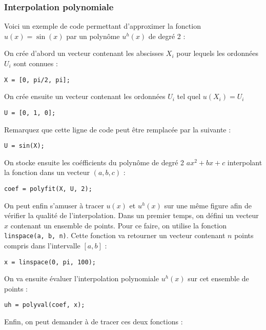 \subsubsection{Interpolation polynomiale}
Voici un exemple de code \matlab{} permettant d'approximer la fonction $u(x) = \sin(x)$
par un polynôme $u^h(x)$ de degré 2 :

On crée d'abord un vecteur contenant les abscisses $X_i$ pour lequels les ordonnées
$U_i$ sont connues :

\begin{lstlisting}
X = [0, pi/2, pi];
\end{lstlisting}

On crée ensuite un vecteur contenant les ordonnées $U_i$ tel quel $u(X_i) = U_i$

\begin{lstlisting}
U = [0, 1, 0]; 
\end{lstlisting}

Remarquez que cette ligne de code peut être remplacée par la suivante :

\begin{lstlisting}
U = sin(X); 
\end{lstlisting}

On stocke ensuite les coéfficients du polynôme de degré 2 $ax^2 + bx + c$ interpolant la fonction
dans un vecteur $(a, b, c)$ :

\begin{lstlisting}
coef = polyfit(X, U, 2); 
\end{lstlisting}

On peut enfin s'amuser à tracer $u(x)$ et $u^h(x)$ sur une même figure afin de vérifier la 
qualité de l'interpolation. Dans un premier temps, on défini un vecteur $x$ contenant un
ensemble de points. Pour ce faire, on utilise la fonction \lstinline{linspace(a, b, n)}. 
Cette fonction va retourner un vecteur contenant $n$ points compris dans l'intervalle
$[a, b]$ :

\begin{lstlisting}
x = linspace(0, pi, 100); 
\end{lstlisting}

On va ensuite évaluer l'interpolation polynomiale $u^h(x)$ sur cet ensemble de points :

\begin{lstlisting}
uh = polyval(coef, x); 
\end{lstlisting}

Enfin, on peut demander à \matlab{} de tracer ces deux fonctions :

